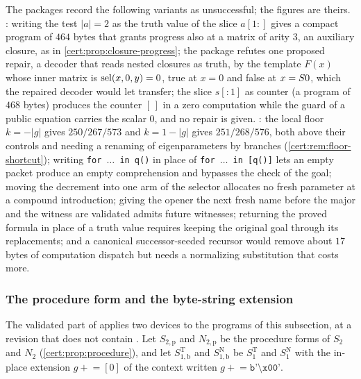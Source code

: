 \begin{remark}\label{cert:rem:examined-variants}
The packages record the following variants as unsuccessful; the figures are
theirs. : writing the test $\lvert a\rvert=2$ as the truth
value of the slice $a[1{:}]$ gives a compact program of $464$ bytes that grants
progress also at a matrix of arity $3$, an auxiliary closure, as in
\cref{cert:prop:closure-progress}; the package refutes one proposed repair, a
decoder that reads nested closures as truth, by the template $F(x)$ whose inner
matrix is $\operatorname{sel}(x,0,y)=0$, true at $x=0$ and false at $x=S 0$, which the
repaired decoder would let  transfer; the slice $s[{:}1]$ as counter
(a program of $468$ bytes) produces the counter $[\,]$ in a zero computation
while the guard of a public equation carries the scalar $0$, and no repair is
given. : the local floor $k=-\lvert g\rvert$ gives
$250/267/573$ and $k=1-\lvert g\rvert$ gives $251/268/576$, both above their
controls and needing a renaming of eigenparameters by branches
(\cref{cert:rem:floor-shortcut}); writing \texttt{for $\dots$ in q()} in place of
\texttt{for $\dots$ in [q()]} lets an empty packet produce an empty comprehension
and bypasses the check of the goal; moving the decrement into one arm of the
selector allocates no fresh parameter at a compound introduction; giving the
opener the next fresh name before the major and the witness are validated
admits future witnesses; returning the proved formula in place of a truth value
requires keeping the original goal through its replacements; and a canonical
successor-seeded recursor would remove about $17$ bytes of computation dispatch
but needs a normalizing substitution that costs more.
\end{remark}

\subsubsection*{The procedure form and the byte-string extension}

The validated part of  applies two devices to the
programs of this subsection, at a revision that does not contain
. Let $S_{2,\mathrm p}$ and $N_{2,\mathrm p}$ be the
procedure forms of $S_2$ and $N_2$ (\cref{cert:prop:procedure}), and let
$S^{\mathrm T}_{1,\mathrm b}$ and $S^{\mathrm N}_{1,\mathrm b}$ be
$S^{\mathrm T}_1$ and $S^{\mathrm N}_1$ with the in-place extension
$g\mathrel{+}=[0]$ of the context written $g\mathrel{+}=\texttt{b'\textbackslash x00'}$.

